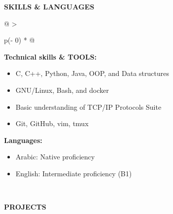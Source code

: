 \documentclass[a4paper]{article}
\begin{document}
\textbf{SKILLS \& LANGUAGES}
\vspace{-8pt}
\nopagebreak[4]
\begin{longtable}[]{@{}
  >{\raggedright\arraybackslash}p{(\columnwidth - 0\tabcolsep) * }@{}}
\toprule\noalign{}
\vspace{-7pt}
\begin{minipage}[t]{\linewidth}\raggedright
    \textbf{Technical skills \& TOOLS:}
    \begin{itemize}
        \item
          C, C++, Python, Java, OOP, and Data structures
        \item
         GNU/Linux, Bash, and docker
        \item
          Basic understanding of TCP/IP Protocols Suite
        \item
          Git, GitHub, vim, tmux
    \end{itemize}

    \textbf{Languages:}
    \begin{itemize}
        \item
          Arabic: Native proficiency
        \item
          English: Intermediate proficiency (B1)
    \end{itemize}
\end{minipage} \\
\end{longtable}
\vspace{-10pt}

\textbf{PROJECTS}
\vspace{-12pt}
\end{document}
